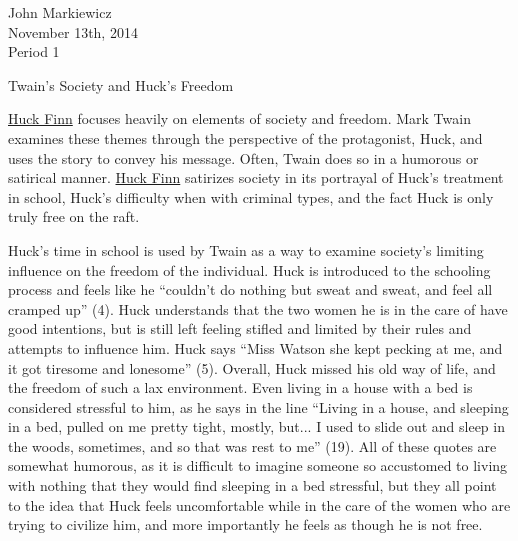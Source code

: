 \documentclass[12pt]{article}
\begin{document}
\begin{singlespace}
\begin{flushright}
John Markiewicz\\
November 13th, 2014\\
Period 1\\
\end{flushright}
\begin{center}
Twain's Society and Huck's Freedom
\end{center}
\end{singlespace}

	\underline{Huck Finn} focuses heavily on elements of society and freedom.  Mark Twain examines these themes through the perspective of the protagonist, Huck, and uses the story to convey his message.  Often, Twain does so in a humorous or satirical manner.  \underline{Huck Finn} satirizes society in its portrayal of Huck's treatment in school, Huck's difficulty when with criminal types, and the fact Huck is only truly free on the raft.

	Huck's time in school is used by Twain as a way to examine society's limiting influence on the freedom of the individual.  Huck is introduced to the schooling process and feels like he ``couldn't do nothing but sweat and sweat, and feel all cramped up'' (4).  Huck understands that the two women he is in the care of have good intentions, but is still left feeling stifled and limited by their rules and attempts to influence him.  Huck says ``Miss Watson she kept pecking at me, and it got tiresome and lonesome'' (5).  Overall, Huck missed his old way of life, and the freedom of such a lax environment.  Even living in a house with a bed is considered stressful to him, as he says in the line ``Living in a house, and sleeping in a bed, pulled on me pretty tight, mostly, but... I used to slide out and sleep in the woods, sometimes, and so that was rest to me'' (19).  All of these quotes are somewhat humorous, as it is difficult to imagine someone so accustomed to living with nothing that they would find sleeping in a bed stressful, but they all point to the idea that Huck feels uncomfortable while in the care of the women who are trying to civilize him, and more importantly he feels as though he is not free.
\end{document}
